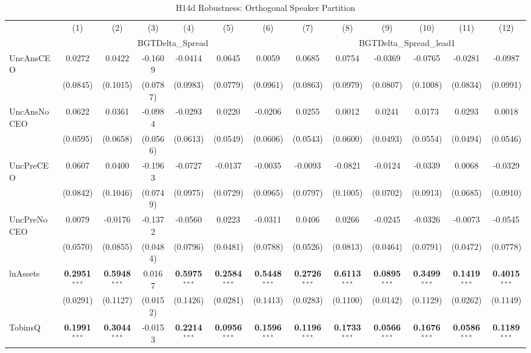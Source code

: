 \documentclass[11pt,a4paper]{article}
\begin{document}
\begin{table}[htbp]
\centering
\caption{H14d Robustness: Orthogonal Speaker Partition}
\label{tab:h14d_robust}
\scriptsize
\begin{tabular}{lcccccccccccc}
\toprule
 & (1) & (2) & (3) & (4) & (5) & (6) & (7) & (8) & (9) & (10) & (11) & (12) \\
 & \multicolumn{6}{c}{BGTDelta\_Spread} & \multicolumn{6}{c}{BGTDelta\_Spread\_lead1} \\
\cmidrule(lr){2-7} \cmidrule(lr){8-13}
\midrule
UncAnsCEO & 0.0272 & 0.0422 & -0.1609 & -0.0414 & 0.0645 & 0.0059 & 0.0685 & 0.0754 & -0.0369 & -0.0765 & -0.0281 & -0.0987 \\
 & (0.0845) & (0.1015) & (0.0787) & (0.0983) & (0.0779) & (0.0961) & (0.0863) & (0.0979) & (0.0807) & (0.1008) & (0.0834) & (0.0991) \\
UncAnsNoCEO & 0.0622 & 0.0361 & -0.0984 & -0.0293 & 0.0220 & -0.0206 & 0.0255 & 0.0012 & 0.0241 & 0.0173 & 0.0293 & 0.0018 \\
 & (0.0595) & (0.0658) & (0.0566) & (0.0613) & (0.0549) & (0.0606) & (0.0543) & (0.0600) & (0.0493) & (0.0554) & (0.0494) & (0.0546) \\
UncPreCEO & 0.0607 & 0.0400 & -0.1963 & -0.0727 & -0.0137 & -0.0035 & -0.0093 & -0.0821 & -0.0124 & -0.0339 & 0.0068 & -0.0329 \\
 & (0.0842) & (0.1046) & (0.0749) & (0.0975) & (0.0729) & (0.0965) & (0.0797) & (0.1005) & (0.0702) & (0.0913) & (0.0685) & (0.0910) \\
UncPreNoCEO & 0.0079 & -0.0176 & -0.1372 & -0.0560 & 0.0223 & -0.0311 & 0.0406 & 0.0266 & -0.0245 & -0.0326 & -0.0073 & -0.0545 \\
 & (0.0570) & (0.0855) & (0.0484) & (0.0796) & (0.0481) & (0.0788) & (0.0526) & (0.0813) & (0.0464) & (0.0791) & (0.0472) & (0.0778) \\
\midrule
lnAssets & \textbf{0.2951}$^{***}$ & \textbf{0.5948}$^{***}$ & 0.0167 & \textbf{0.5975}$^{***}$ & \textbf{0.2584}$^{***}$ & \textbf{0.5448}$^{***}$ & \textbf{0.2726}$^{***}$ & \textbf{0.6113}$^{***}$ & \textbf{0.0895}$^{***}$ & \textbf{0.3499}$^{***}$ & \textbf{0.1419}$^{***}$ & \textbf{0.4015}$^{***}$ \\
 & (0.0291) & (0.1127) & (0.0152) & (0.1426) & (0.0281) & (0.1413) & (0.0283) & (0.1100) & (0.0142) & (0.1129) & (0.0262) & (0.1149) \\
TobinsQ & \textbf{0.1991}$^{***}$ & \textbf{0.3044}$^{***}$ & -0.0153 & \textbf{0.2214}$^{***}$ & \textbf{0.0956}$^{***}$ & \textbf{0.1596}$^{***}$ & \textbf{0.1196}$^{***}$ & \textbf{0.1733}$^{***}$ & \textbf{0.0566}$^{***}$ & \textbf{0.1676}$^{***}$ & \textbf{0.0586}$^{***}$ & \textbf{0.1189}$^{***}$ \\

\end{tabular}
\end{table}
\end{document}
